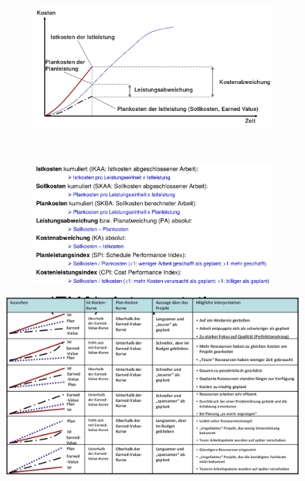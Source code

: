 \documentclass[11pt,a4paper]{article}
\begin{document}
\begin{figure}[H]
	\centering
	\begin{subfigure}{0.49\textwidth}
		\includegraphics[width=\textwidth]{ch11/evagraf}
	\end{subfigure}
	~
	\begin{subfigure}{0.49\textwidth}
		\includegraphics[width=\textwidth]{ch11/kosten}
	\end{subfigure}
\end{figure}

\begin{figure}[H]
	\centering
	\includegraphics[width=\textwidth]{ch11/eva}
\end{figure}
\pagebreak
\end{document}
